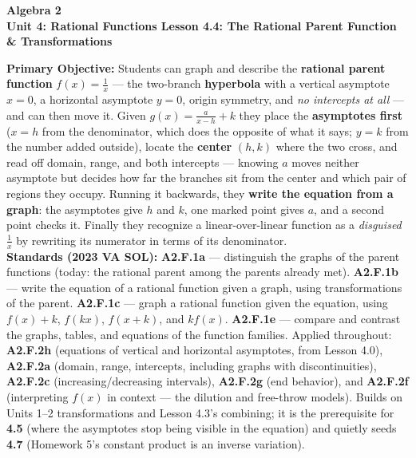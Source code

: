 \documentclass[10pt]{article}
\newcommand{\CourseName}{Algebra 2}
\newcommand{\UnitNumberName}{Unit 4: Rational Functions \quad}
\newcommand{\LessonNumberName}{Lesson 4.4: The Rational Parent Function \& Transformations}
\begin{document}
\begin{center}
    {\Large\bfseries \CourseName \\
    {\small\bfseries \UnitNumberName \LessonNumberName}}
\end{center}

\begin{tcolorbox}[colback=forestbg, colframe=forest, boxrule=0.9pt, arc=2mm,
    left=2mm, right=2mm, top=1.5mm, bottom=1.5mm]
    \textbf{Primary Objective:} Students can graph and describe the \textbf{rational parent function}
    $f(x)=\frac1x$ --- the two-branch \textbf{hyperbola} with a vertical asymptote $x=0$, a horizontal
    asymptote $y=0$, origin symmetry, and \emph{no intercepts at all} --- and can then move it. Given
    $g(x)=\frac{a}{x-h}+k$ they place the \textbf{asymptotes first} ($x=h$ from the denominator, which
    does the opposite of what it says; $y=k$ from the number added outside), locate the \textbf{center}
    $(h,k)$ where the two cross, and read off domain, range, and both intercepts --- knowing $a$ moves
    neither asymptote but decides how far the branches sit from the center and which pair of regions
    they occupy. Running it backwards, they \textbf{write the equation from a graph}: the asymptotes
    give $h$ and $k$, one marked point gives $a$, and a second point checks it. Finally they recognize
    a linear-over-linear function as a \emph{disguised} $\frac1x$ by rewriting its numerator in terms
    of its denominator.
    \\[2pt]
    \textbf{Standards (2023 VA SOL):} \textbf{A2.F.1a} --- distinguish the graphs of the parent
    functions (today: the rational parent among the parents already met). \textbf{A2.F.1b} --- write
    the equation of a rational function given a graph, using transformations of the parent.
    \textbf{A2.F.1c} --- graph a rational function given the equation, using $f(x)+k$, $f(kx)$,
    $f(x+k)$, and $kf(x)$. \textbf{A2.F.1e} --- compare and contrast the graphs, tables, and equations
    of the function families. Applied throughout: \textbf{A2.F.2h} (equations of vertical and
    horizontal asymptotes, from Lesson 4.0), \textbf{A2.F.2a} (domain, range, intercepts, including
    graphs with discontinuities), \textbf{A2.F.2c} (increasing/decreasing intervals), \textbf{A2.F.2g}
    (end behavior), and \textbf{A2.F.2f} (interpreting $f(x)$ in context --- the dilution and
    free-throw models). Builds on Units 1--2 transformations and Lesson 4.3's combining; it is the
    prerequisite for \textbf{4.5} (where the asymptotes stop being visible in the equation) and quietly
    seeds \textbf{4.7} (Homework 5's constant product is an inverse variation).
\end{tcolorbox}
\end{document}
